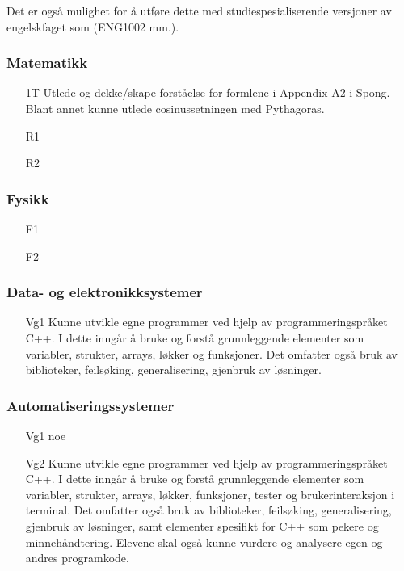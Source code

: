 		Det er også mulighet for å utføre dette med studiespesialiserende versjoner av engelskfaget som (ENG1002 mm.).


	\subsubsection*{Matematikk}

		\begin{itemize}

			\item[1T]  Utlede og dekke/skape forståelse for formlene i Appendix A2 i Spong. Blant annet kunne utlede cosinussetningen med Pythagoras.
			\item[R1]
			\item[R2]

		\end{itemize}


	\subsubsection*{Fysikk}

		\begin{itemize}

			\item[F1]
			\item[F2]

		\end{itemize}

	\subsubsection*{Data- og elektronikksystemer}

		\begin{itemize}

			\item[Vg1] Kunne utvikle egne programmer ved hjelp av programmeringspråket C++. I dette inngår å bruke og forstå grunnleggende elementer som variabler, strukter, arrays, løkker og funksjoner. Det omfatter også bruk av biblioteker, feilsøking, generalisering, gjenbruk av løsninger.

		\end{itemize}


	\subsubsection*{Automatiseringssystemer}

		\begin{itemize}

			\item[Vg1] noe

			\item[Vg2] Kunne utvikle egne programmer ved hjelp av programmeringspråket C++. I dette inngår å bruke og forstå grunnleggende elementer som variabler, strukter, arrays, løkker, funksjoner, tester og brukerinteraksjon i terminal. Det omfatter også bruk av biblioteker, feilsøking, generalisering, gjenbruk av løsninger, samt elementer spesifikt for C++ som pekere og minnehåndtering. Elevene skal også kunne vurdere og analysere egen og andres programkode.

		\end{itemize}
